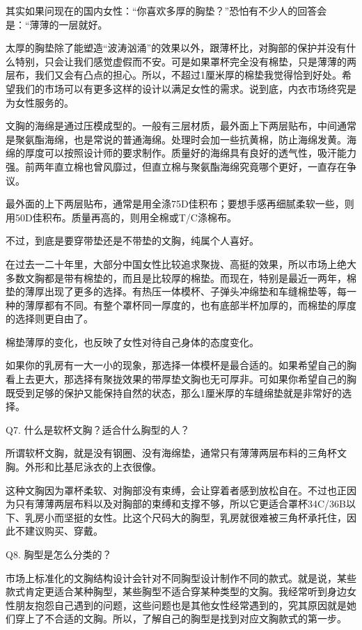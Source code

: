 \documentclass[12pt,UTF8]{ctexbook}
\begin{document}
其实如果问现在的国内女性：“你喜欢多厚的胸垫？”恐怕有不少人的回答会是：“薄薄的一层就好。



太厚的胸垫除了能塑造“波涛汹涌”的效果以外，跟薄杯比，对胸部的保护并没有什么特别，只会让我们感觉虚假而不安。可是如果罩杯完全没有棉垫，只是薄薄的两层布，我们又会有凸点的担心。所以，不超过1厘米厚的棉垫我觉得恰到好处。希望我们的市场可以有更多这样的设计以满足女性的需求。说到底，内衣市场终究是为女性服务的。

文胸的海绵是通过压模成型的。一般有三层材质，最外面上下两层贴布，中间通常是聚氨酯海绵，也是常说的普通海绵。处理时会加一些抗黄棉，防止海绵发黄。海绵的厚度可以按照设计师的要求制作。质量好的海绵具有良好的透气性，吸汗能力强。前两年直立棉也曾风靡过，但直立棉与聚氨酯海绵究竟哪个更好，一直存在争议。

最外面的上下两层贴布，通常是用全涤75D佳积布；要想手感再细腻柔软一些，则用50D佳积布。质量再高的，则用全棉或T/C涤棉布。

不过，到底是要穿带垫还是不带垫的文胸，纯属个人喜好。

在过去一二十年里，大部分中国女性比较追求聚拢、高挺的效果，所以市场上绝大多数文胸都是带有棉垫的，而且是比较厚的棉垫。而现在，特别是最近一两年，棉垫的薄厚出现了更多的选择。有热压一体模杯、子弹头冲绵垫和车缝棉垫等，每一种的薄厚都有不同。有整个罩杯同一厚度的，也有底部半杯加厚的，而棉垫的厚度的选择则更自由了。

棉垫薄厚的变化，也反映了女性对待自己身体的态度变化。

如果你的乳房有一大一小的现象，那选择一体模杯是最合适的。如果希望自己的胸看上去更大，那选择有聚拢效果的带厚垫文胸也无可厚非。可如果你希望自己的胸既受到足够的保护又能保持自然的状态，那么1厘米厚的车缝绵垫就是非常好的选择。





Q7. 什么是软杯文胸？适合什么胸型的人？


所谓软杯文胸，就是没有钢圈、没有海绵垫，通常只有薄薄两层布料的三角杯文胸。外形和比基尼泳衣的上衣很像。

这种文胸因为罩杯柔软、对胸部没有束缚，会让穿着者感到放松自在。不过也正因为只有薄薄两层布料以及对胸部的束缚和支撑不够，所以它更适合罩杯34C/36B以下、乳房小而坚挺的女性。比这个尺码大的胸型，乳房就很难被三角杯承托住，因此不建议购买、穿戴。





Q8. 胸型是怎么分类的？


市场上标准化的文胸结构设计会针对不同胸型设计制作不同的款式。就是说，某些款式肯定更适合某种胸型，某些胸型不适合穿某种类型的文胸。我经常听到身边女性朋友抱怨自己遇到的问题，这些问题也是其他女性经常遇到的，究其原因就是她们穿上了不合适的文胸。所以，了解自己的胸型是找到对应文胸款式的第一步。
\end{document}
